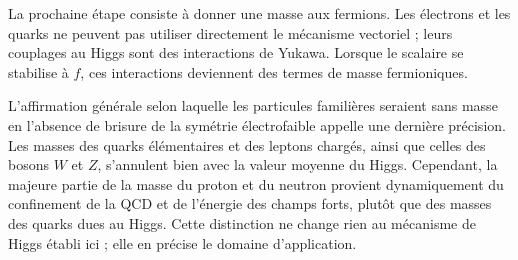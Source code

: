 La prochaine étape consiste à donner une masse aux fermions. Les électrons et les quarks ne peuvent pas utiliser directement le mécanisme vectoriel ; leurs couplages au Higgs sont des interactions de Yukawa. Lorsque le scalaire se stabilise à \(f\), ces interactions deviennent des termes de masse fermioniques.

L’affirmation générale selon laquelle les particules familières seraient sans masse en l’absence de brisure de la symétrie électrofaible appelle une dernière précision. Les masses des quarks élémentaires et des leptons chargés, ainsi que celles des bosons \(W\) et \(Z\), s’annulent bien avec la valeur moyenne du Higgs. Cependant, la majeure partie de la masse du proton et du neutron provient dynamiquement du confinement de la QCD et de l’énergie des champs forts, plutôt que des masses des quarks dues au Higgs. Cette distinction ne change rien au mécanisme de Higgs établi ici ; elle en précise le domaine d’application.
